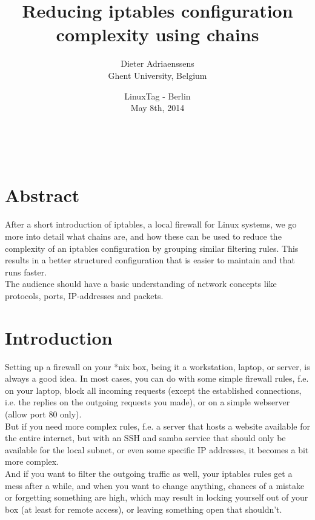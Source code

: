 \documentclass[a4paper,12pt]{article}
\begin{document}
\title{Reducing iptables configuration complexity using chains}
\author{Dieter Adriaenssens\\
Ghent University, Belgium}
\date{LinuxTag - Berlin\\
May 8th, 2014}
\maketitle

\vfill
\begin{center}
  \\[2.5ex]
    {\footnotesize\CcNote{\CcLongnameBySa}}
  \vspace*{-2.5ex}
\end{center}

\pagebreak
\section{Abstract}

After a short introduction of iptables, a local firewall for Linux systems, we go more into detail what chains are, and how these can be used to reduce the complexity of an iptables configuration by grouping similar filtering rules. This results in a better structured configuration that is easier to maintain and that runs faster.\\

The audience should have a basic understanding of network concepts like protocols, ports, IP-addresses and packets.

\tableofcontents
\pagebreak

\section{Introduction}
Setting up a firewall on your *nix box, being it a workstation, laptop, or server, is always a good idea. In most cases, you can do with some simple firewall rules, f.e. on your laptop, block all incoming requests (except the established connections, i.e. the replies on the outgoing requests you made), or on a simple webserver (allow port 80 only).\\

But if you need more complex rules, f.e. a server that hosts a website available for the entire internet, but with an SSH and samba service that should only be available for the local subnet, or even some specific IP addresses, it becomes a bit more complex.\\
And if you want to filter the outgoing traffic as well, your iptables rules get a mess after a while, and when you want to change anything, chances of a mistake or forgetting something are high, which may result in locking yourself out of your box (at least for remote access), or leaving something open that shouldn't.\\
\end{document}
